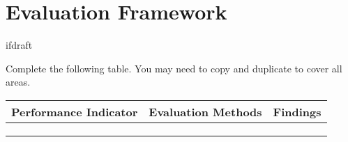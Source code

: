 \documentclass[qipps.tex]{subfiles}
\begin{document}
\section{Evaluation Framework}
ifdraft{
Complete the following table. You may need to copy and duplicate to cover all areas.

}{}
\begin{tabu} to 170mm {|X[1,l]|X[1,l]|X[1,l]|} \hline
Performance Indicator & Evaluation Methods & Findings \\ \hline
  &   &  \\ \hline
  &   &  \\ \hline
  &   &  \\ \hline
\end{tabu}

\end{document}
